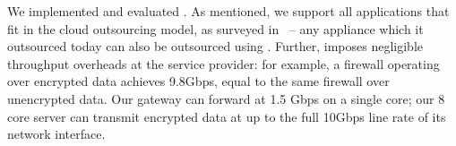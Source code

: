 We implemented and evaluated \sys. As mentioned, we support all applications that fit in the cloud outsourcing model, as surveyed in~\cite{aplomb} -- any appliance which it outsourced today can also be outsourced using \sys.
Further, \sys imposes negligible throughput overheads at the service provider: for example, a firewall operating over encrypted data achieves 9.8Gbps, equal to the same firewall over unencrypted data.
Our gateway can forward at 1.5 Gbps on a single core; our 8 core server can transmit \sys encrypted data at up to the full 10Gbps line rate of its network interface.

